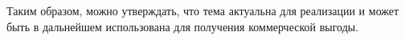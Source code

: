 Таким образом, можно утверждать, что тема актуальна для реализации
и может быть в дальнейшем использована для получения коммерческой выгоды.

